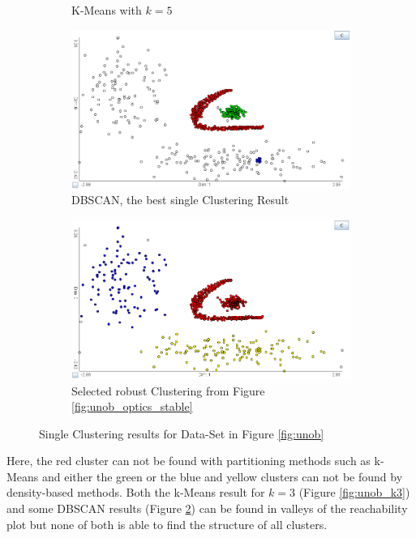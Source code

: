 \documentclass[
	a4paper,
	english,
	twoside,
	openright,               
	11pt                            
	]{report}
\begin{document}
\begin{figure}[h]
\begin{subfigure}[t]{.49\textwidth}
  \caption{K-Means with $k=5$}
  \label{fig:unob_k5ex}
\end{subfigure}
\hfill
\begin{subfigure}[t]{.49\textwidth}
  \centering
  \includegraphics[width=.95\linewidth]{unob_best}
  \caption{DBSCAN, the best single Clustering Result}
  \label{fig:unob_best}
\end{subfigure}
\medskip
\begin{subfigure}[t]{.49\textwidth}
	\centering
	\includegraphics[width=.95\linewidth]{unob_stable}
	\caption{Selected robust Clustering from Figure \ref{fig:unob_optics_stable}}
	\label{fig:unob_stable}
\end{subfigure}
\caption{Single Clustering results for Data-Set in Figure \ref{fig:unob}}
\label{fig:single}
\end{figure}


Here, the red cluster can not be found with partitioning methods such as k-Means and either the green or the blue and yellow clusters can not be found by density-based methods. Both the k-Means result for $k=3$ (Figure \ref{fig:unob_k3}) and some DBSCAN results (Figure \ref{fig:unob_best}) can be found in valleys of the reachability plot but none of both is able to find the structure of all clusters.
\end{document}
